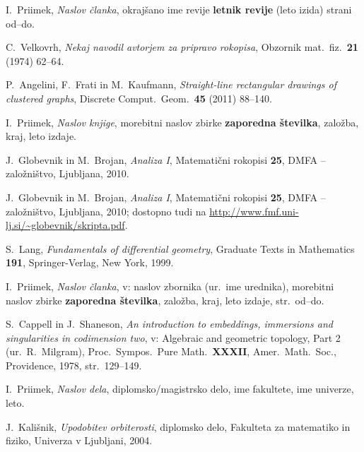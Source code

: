 \documentclass[mat1]{fmfdelo}
\begin{document}
\begin{thebibliography}{99}


I.~Priimek, \emph{Naslov članka}, okrajšano ime revije \textbf{letnik revije} (leto izida) strani od--do.

C.~Velkovrh, \emph{Nekaj navodil avtorjem za pripravo rokopisa}, Obzornik mat.\ fiz.\ \textbf{21} (1974) 62--64.

P.~Angelini, F.~Frati in M.~Kaufmann, \emph{Straight-line rectangular drawings of clustered graphs}, Discrete Comput.\ Geom.\ \textbf{45} (2011) 88--140.



I.~Priimek, \emph{Naslov knjige}, morebitni naslov zbirke  \textbf{zaporedna številka}, založba, kraj, leto izdaje.

J.~Globevnik in M.~Brojan, \emph{Analiza I}, Matematični rokopisi \textbf{25}, DMFA -- založništvo, Ljubljana, 2010.

J.~Globevnik in M.~Brojan, \emph{Analiza I}, Matematični rokopisi \textbf{25}, DMFA -- založništvo, Ljubljana, 2010; dostopno tudi na
\url{http://www.fmf.uni-lj.si/~globevnik/skripta.pdf}.

S.~Lang, \emph{Fundamentals of differential geometry}, Graduate Texts in Mathematics {\bf 191}, Springer-Verlag, New York, 1999.



I.~Priimek, \emph{Naslov članka}, v: naslov zbornika (ur.\ ime urednika), morebitni naslov zbirke  \textbf{zaporedna številka}, založba, kraj, leto izdaje, str.\ od--do.

S.~Cappell in J.~Shaneson, \emph{An introduction to embeddings, immersions and singularities in codimension two}, v: Algebraic and geometric topology, Part 2 (ur.\ R.~Milgram), Proc.\ Sympos.\ Pure Math.\ \textbf{XXXII}, Amer.\ Math.\ Soc., Providence, 1978, str.\ 129--149.



I.~Priimek, \emph{Naslov dela}, diplomsko/magistrsko delo, ime fakultete, ime univerze, leto.

J.~Kališnik, \emph{Upodobitev orbiterosti}, diplomsko delo, Fakulteta za matematiko in fiziko, Univerza v Ljubljani, 2004.




\end{thebibliography}
\end{document}
